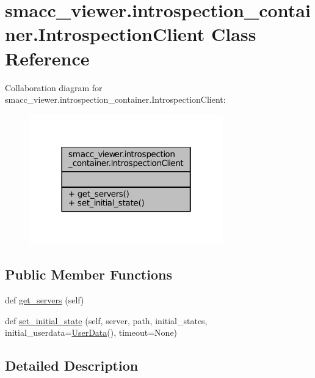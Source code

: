 \hypertarget{classsmacc__viewer_1_1introspection__container_1_1IntrospectionClient}{}\section{smacc\+\_\+viewer.\+introspection\+\_\+container.\+Introspection\+Client Class Reference}
\label{classsmacc__viewer_1_1introspection__container_1_1IntrospectionClient}


Collaboration diagram for smacc\+\_\+viewer.\+introspection\+\_\+container.\+Introspection\+Client\+:
\nopagebreak
\begin{figure}[H]
\begin{center}
\leavevmode
\includegraphics[width=238pt]{classsmacc__viewer_1_1introspection__container_1_1IntrospectionClient__coll__graph}
\end{center}
\end{figure}
\subsection*{Public Member Functions}
\begin{DoxyCompactItemize}
\item 
def \hyperlink{classsmacc__viewer_1_1introspection__container_1_1IntrospectionClient_adfc8a30eb9691a1fcec3f8e54fb491bc}{get\+\_\+servers} (self)
\item 
def \hyperlink{classsmacc__viewer_1_1introspection__container_1_1IntrospectionClient_afc46c103e4237c9a4e14de8abaf4c152}{set\+\_\+initial\+\_\+state} (self, server, path, initial\+\_\+states, initial\+\_\+userdata=\hyperlink{classsmacc__viewer_1_1smacc__user__data_1_1UserData}{User\+Data}(), timeout=None)
\end{DoxyCompactItemize}


\subsection{Detailed Description}


